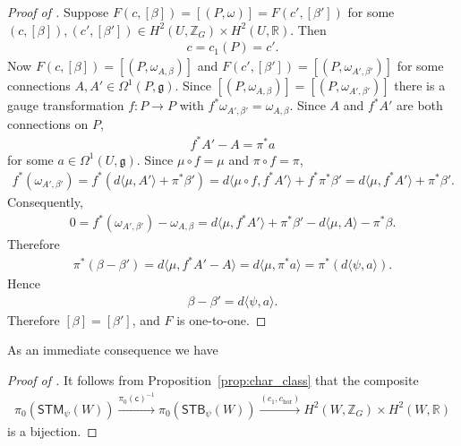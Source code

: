 \documentclass[10pt,a4paper]{amsart}
\numberwithin{equation}{section}
\begin{document}
\begin{proof}[Proof of ]
Suppose $F(c, [\beta]) = [(P,\omega)]= F(c',[\beta'])$ for some
$(c, [\beta]), (c',[\beta'])\in  H^2 (U, {\mathbb Z}_G)\times H^2 (U,{\mathbb R})$.  Then
\begin{gather*}
c = c_1(P) = c'.
\end{gather*}
Now $F(c, [\beta]) =[(P, \omega_{A,\beta})]$ and $F(c', [\beta'])
=[(P, \omega_{A',\beta'})]$ for some connections
$A,A'\in\Omega^1(P,{\mathfrak g})$.  Since $[(P, \omega_{A,\beta})]= [(P,
\omega_{A',\beta'})]$ there is a gauge transformation $f\colon P\to P$ with
$f^*\omega _{A',\beta'} = \omega_{A,\beta}$.  Since $A$ and $f^*A'$ are
  both connections on $P$,
\begin{gather*}
f^*A' - A = \pi^* a
\end{gather*}
for some $a\in \Omega^1 (U,{\mathfrak g})$.  Since $\mu \circ f = \mu$ and $\pi
\circ f = \pi$,
\begin{gather*}
f^*(\omega_{A',\beta'})= f^*( d \langle \mu , A'\rangle +\pi^*\beta')
= d \langle \mu\circ f , f^*A'\rangle +f^*\pi^*\beta' = d \langle \mu,
f^*A'\rangle +\pi^*\beta'.
\end{gather*}
Consequently,
\begin{gather*}
0 = f^*(\omega_{A',\beta'}) - \omega_{A,\beta} = d\langle \mu,
f^*A'\rangle +\pi^*\beta' - d\langle \mu, A\rangle -\pi^*\beta.
\end{gather*}
Therefore
\begin{gather*}
\pi^*(\beta -\beta') =d\langle \mu,
f^*A' -A \rangle = d \langle \mu , \pi^*a\rangle
= \pi^* (d\langle \psi, a\rangle).
\end{gather*}
Hence
\begin{gather*}
\beta -\beta' = d\langle \psi, a\rangle.
\end{gather*}
Therefore $[\beta] = [\beta']$, and $F$ is one-to-one.
\end{proof}

As an immediate consequence we have

\begin{proof}[Proof of ]
It follows from Proposition~\ref{prop:char_class} that the composite
\begin{gather*}
 \pi_0({\textsf{STM}}_\psi(W))\xrightarrow{ \pi_0({\textsf{c}})^{-1} } \pi_0({\textsf{STB}}_\psi (W))
 \xrightarrow{(c_1, c_{\text{hor}})} H^2 (W, {\mathbb Z}_G)\times H^2 (W,{\mathbb R})
\end{gather*}
is a bijection.
\end{proof}
\end{document}
